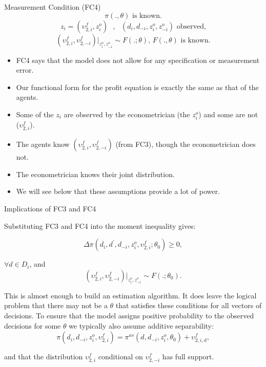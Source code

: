 \documentclass[xcolor=pdftex,dvipsnames,table,mathserif]{beamer}
\begin{document}
\begin{frame}{Measurement Condition (FC4)}
\begin{equation*}
\pi (.,\theta )\text{ is known.}
\end{equation*}%
\begin{equation*}
z_{i}=(\upsilon _{2,i}^{f},z_{i}^{o})\text{ },\text{ }%
(d_{i},d_{-i},z_{i}^{o},z_{-i}^{o})\text{ observed,}
\end{equation*}%
\begin{equation*}
(\upsilon _{2,i}^{f},\upsilon _{2,-i}^{f})|_{z_{i}^{o},z_{-i}^{o}}\sim
F(.;\theta )\text{, }F(.,\theta )\text{ is known.}
\end{equation*}
\begin{itemize}
\item FC4 says that the model does not allow for any specification or measurement
error. 
\item Our functional form for the profit equation is exactly the
same as that of the agents.
\item Some of the $z_{i}$ are observed by the
econometrician (the $z_{i}^{o}$) and some are not ($\upsilon _{2,i}^{f}$).
\item The agents know $(\upsilon _{2,i}^{f},\upsilon _{2,-i}^{f})$ (from FC3), though the
econometrician does not.
\item The econometrician knows their joint distribution.
\item  We will see below that these assumptions provide a lot of power.
\end{itemize}
\end{frame}


\begin{frame}{Implications of FC3 and FC4}

Substituting FC3 and FC4 into the moment inequality gives:

\begin{equation*}
\Delta \pi (d_{i},d^{\prime },d_{-i},z_{i}^{o},\upsilon _{2,i}^{f};\theta
_{0})\geq 0,
\end{equation*}

$\forall d\in D_{i}$, and%
\begin{equation*}
(\upsilon _{2,i}^{f},\upsilon _{2,-i}^{f})|_{z_{i}^{o},z_{-i}^{o}}\sim
F(.;\theta _{0}).
\end{equation*}

This is almost enough to build an estimation algorithm. It does leave the
logical problem that there may not be a $\theta $ that satisfies these
conditions for all vectors of decisions. To ensure that the model assigns
positive probability to the observed decisions for some $\theta $ we
typically also assume additive separability:%
\begin{equation*}
\pi (d_{i},d_{-i},z_{i}^{o},\upsilon _{2,i}^{f})=\pi
^{as}(d,d_{-i},z_{i}^{o},\theta _{0})+\upsilon _{2,i,d}^{f},
\end{equation*}

and that the distribution $\upsilon _{2,i}^{f}$ conditional on $\upsilon
_{2,-i}^{f}$ has full support.
\end{frame}
\end{document}
